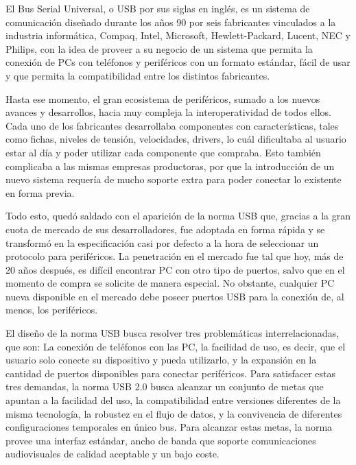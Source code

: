 El Bus Serial Universal, o USB por sus siglas en inglés, es un sistema de comunicación diseñado durante los años 90 por seis fabricantes vinculados a la industria informática, Compaq, Intel, Microsoft, Hewlett-Packard, Lucent, NEC y Philips, con la idea de proveer a su negocio de un sistema que permita la conexión de PCs con teléfonos y periféricos con un formato estándar, fácil de usar y que permita la compatibilidad entre los distintos fabricantes.%

Hasta ese momento, el gran ecosistema de periféricos, sumado a los nuevos avances y desarrollos, hacia muy compleja la interoperatividad de todos ellos. Cada uno de los fabricantes desarrollaba componentes con características, tales como fichas, niveles de tensión, velocidades, drivers, lo cuál dificultaba al usuario estar al día y poder utilizar cada componente que compraba. Esto también complicaba a las mismas empresas productoras, por que la introducción de un nuevo sistema requería de mucho soporte extra para poder conectar lo existente en forma previa.%

Todo esto, quedó saldado con el aparición de la norma USB que, gracias a la gran cuota de mercado de sus desarrolladores, fue adoptada en forma rápida y se transformó en la especificación casi por defecto a la hora de seleccionar un protocolo para periféricos. La penetración en el mercado fue tal que hoy, más de 20 años después, es difícil encontrar PC con otro tipo de puertos, salvo que en el momento de compra se solicite de manera especial. No obstante, cualquier PC nueva disponible en el mercado debe poseer puertos USB para la conexión de, al menos, los periféricos.%

El diseño de la norma USB busca resolver tres problemáticas interrelacionadas, que son: La conexión de teléfonos con las PC, la facilidad de uso, es decir, que el usuario solo conecte su dispositivo y pueda utilizarlo, y la expansión en la cantidad de puertos disponibles para conectar periféricos\cite{USBspec}. Para satisfacer estas tres demandas, la norma USB 2.0 busca alcanzar un conjunto de metas que apuntan a la facilidad del uso, la compatibilidad entre versiones diferentes de la misma tecnología, la robustez en el flujo de datos, y la convivencia de diferentes configuraciones temporales en único bus. Para alcanzar estas metas, la norma provee una interfaz estándar, ancho de banda que soporte comunicaciones audiovisuales de calidad aceptable y un bajo coste.%

